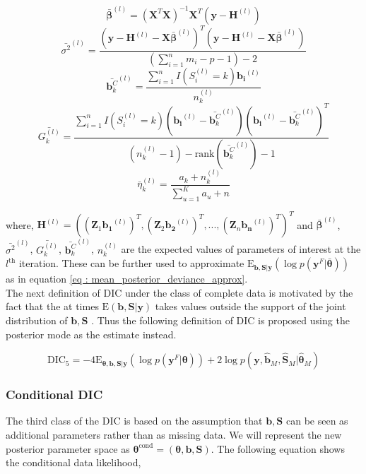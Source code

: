 $$\boldsymbol{\bar{\beta}}^{(l)} = (\boldsymbol{X}^T\boldsymbol{X})^{-1}\boldsymbol{X}^T(\boldsymbol{y}-\boldsymbol{H}^{(l)})$$
$$\bar{\sigma^2}^{(l)} = \frac {(\boldsymbol{y}-\boldsymbol{H}^{(l)}-\boldsymbol{X}\boldsymbol{\bar{\beta}}^{(l)})^T (\boldsymbol{y}-\boldsymbol{H}^{(l)}-\boldsymbol{X}\boldsymbol{\bar{\beta}}^{(l)})} {(\sum_{i=1}^n m_i - p - 1) -2}$$
$$\bar{\boldsymbol{b}_k^C}^{(l)} = \frac {\sum_{i=1}^n I(S_i^{(l)}=k) \boldsymbol{b_i}^{(l)}} {n_k^{(l)}}$$
$$\bar{G_k^{(l)}} = \frac {\sum_{i=1}^n I(S_i^{(l)}=k) (\boldsymbol{b_i}^{(l)}-\bar{\boldsymbol{b}_k^C}^{(l)})(\boldsymbol{b_i}^{(l)}-\bar{\boldsymbol{b}_k^C}^{(l)})^T} 
{(n_k^{(l)} - 1) - \text{rank}(\bar{\boldsymbol{b}_k^C}^{(l)}) - 1}$$
$$\bar{\eta}_k^{(l)} = \frac {a_k + n_k^{(l)}} {\sum_{u=1}^K a_u + n}$$

where, $\boldsymbol{H}^{(l)} = {( (\boldsymbol{Z}_1\boldsymbol{b_1}^{(l)})^T, (\boldsymbol{Z}_2\boldsymbol{b_2}^{(l)})^T, ...,(\boldsymbol{Z}_n\boldsymbol{b_n}^{(l)})^T)}^T$ and $\boldsymbol{\bar{\beta}}^{(l)}$, $\bar{\sigma^2}^{(l)}$, $\bar{G_k^{(l)}}$, $\bar{\boldsymbol{b}_k^C}^{(l)}$, $n_k^{(l)}$ are the expected values of parameters of interest at the $l^\text{th}$ iteration. These can be further used to approximate $\text{E}_{\boldsymbol{b}, \boldsymbol{S}|\boldsymbol{y}}(\log{p(\boldsymbol{y}^F|\boldsymbol{\bar{\theta}})})$ as in equation \ref{eq : mean_posterior_deviance_approx}.\\

The next definition of DIC under the class of complete data is motivated by the fact that the at times $\text{E}(\boldsymbol{b}, \boldsymbol{S}|\boldsymbol{y})$ takes values outside the support of the joint distribution of $\boldsymbol{b}, \boldsymbol{S}$ \citep{celeux_deviance_2006}. Thus the following definition of DIC is proposed using the posterior mode as the estimate instead.

\begin{equation}
\label{eq : DIC5}
\text{DIC}_5 = -4\text{E}_{\boldsymbol{\theta}, \boldsymbol{b}, \boldsymbol{S}|\boldsymbol{y}}(\log{p(\boldsymbol{y}^F|\boldsymbol{\theta})}) + 
2\log{p(\boldsymbol{y}, \boldsymbol{\hat{b}}_M, \boldsymbol{\hat{S}}_M|\boldsymbol{\hat{\theta}}_M)}
\end{equation}

\subsubsection{Conditional DIC}
The third class of the DIC is based on the assumption that $\boldsymbol{b}, \boldsymbol{S}$ can be seen as additional parameters rather than as missing data. We will represent the new posterior parameter space as $\boldsymbol{\theta}^\text{cond} = (\boldsymbol{\theta}, \boldsymbol{b}, \boldsymbol{S})$. The following equation shows the conditional data likelihood,

